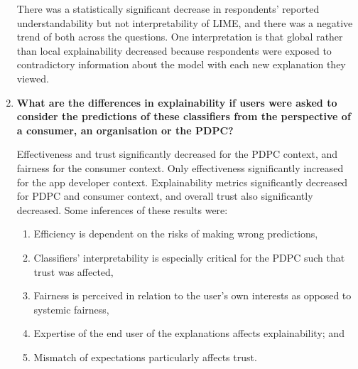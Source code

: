 \begin{enumerate}
    There was a statistically significant decrease in respondents' reported understandability but not interpretability of LIME, and there was a negative trend of both across the questions. One interpretation is that global rather than local explainability decreased because respondents were exposed to contradictory information about the model with each new explanation they viewed.

    \item \textbf{What are the differences in explainability if users were asked to consider the predictions of these classifiers from the perspective of a consumer, an organisation or the PDPC?}
    
    Effectiveness and trust significantly decreased for the PDPC context, and fairness for the consumer context. Only effectiveness significantly increased for the app developer context. Explainability metrics significantly decreased for PDPC and consumer context, and overall trust also significantly decreased. Some inferences of these results were:
    \begin{enumerate}
        \item Efficiency is dependent on the risks of making wrong predictions,
        \item Classifiers' interpretability is especially critical for the PDPC such that trust was affected,
        \item Fairness is perceived in relation to the user's own interests as opposed to systemic fairness,
        \item Expertise of the end user of the explanations affects explainability; and
        \item Mismatch of expectations particularly affects trust.
    \end{enumerate}
\end{enumerate}

